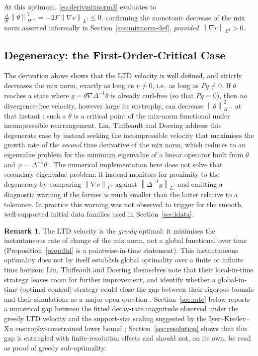 \documentclass[12pt,a4paper]{article}
\newcommand{\norm}[1]{\left\lVert#1\right\rVert}
\newcommand{\lapinv}{\Delta^{-1}}
\newcommand{\Proj}{P}
\theoremstyle{definition}
\newtheorem{remark}{Remark}
\theoremstyle{plain}
\begin{document}
At this optimum, \eqref{eq:derivmixnorm3} evaluates to
$\frac{d}{dt}\norm{\theta}_{H^{-1}}^2 = -2F\norm{\nabla v}_{L^2} \le 0$,
confirming the monotonic decrease of the mix norm asserted informally in
Section~\ref{sec:mixnorm-def}, \emph{provided} $\norm{\nabla v}_{L^2}>0$.

\subsection{Degeneracy: the First-Order-Critical Case}
\label{sec:saddle}

The derivation above shows that the LTD velocity is well defined, and
strictly decreases the mix norm, exactly as long as $v\neq 0$, i.e.\ as
long as $\Proj g \neq 0$. If $\theta$ reaches a state where $g=\theta
\nabla\lapinv\theta$ is already curl-free (so that $\Proj g = 0$), then
\emph{no} divergence-free velocity, however large its enstrophy, can
decrease $\norm{\theta}_{H^{-1}}^2$ at that instant \cite{LTD2011}: such a
$\theta$ is a critical point of the mix-norm functional under
incompressible rearrangement. Lin, Thiffeault and Doering address this
degenerate case by instead seeking the incompressible velocity that
maximises the growth rate of the \emph{second} time derivative of the mix
norm, which reduces to an eigenvalue problem for the minimum eigenvalue of
a linear operator built from $\theta$ and $\varphi=\lapinv\theta$
\cite{LTD2011}. The numerical implementation here does not solve that
secondary eigenvalue problem; it instead monitors for proximity to the
degeneracy by comparing $\norm{\nabla v}_{L^2}$ against
$\norm{\lapinv g}_{L^2}$ and emitting a diagnostic warning if the former is
much smaller than the latter relative to a tolerance. In practice this
warning was not observed to trigger for the smooth, well-supported initial
data families used in Section~\ref{sec:idata}.

\begin{remark}
  The LTD velocity is the \emph{greedy} optimal: it minimises the
  instantaneous rate of change of the mix norm, not a global functional
  over time (Proposition~\ref{prop:ltd} is a pointwise-in-time statement).
  This instantaneous optimality does not by itself establish global
  optimality over a finite or infinite time horizon: Lin, Thiffeault and
  Doering themselves note that their local-in-time strategy leaves room
  for further improvement, and identify whether a global-in-time (optimal
  control) strategy could close the gap between their rigorous bounds and
  their simulations as a major open question \cite{LTD2011}.
  Section~\ref{sec:rate} below reports a numerical gap between the fitted
  decay-rate magnitude observed under the greedy LTD velocity and the
  support-size scaling suggested by the Iyer--Kiselev--Xu
  enstrophy-constrained lower bound \cite{Iyer2014}; Section~\ref{sec:resolution}
  shows that this gap is entangled with finite-resolution effects and
  should not, on its own, be read as proof of greedy sub-optimality.
\end{remark}
\end{document}
